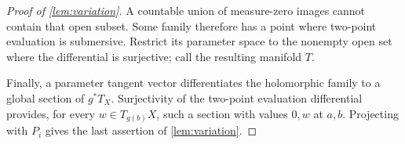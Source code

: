 \begin{proof}[Proof of \cref{lem:variation}]
A countable union of measure-zero images cannot contain
that open subset. Some family therefore has a point where
two-point evaluation is submersive. Restrict its parameter
space to the nonempty open set where the differential is
surjective; call the resulting manifold \(T\).

Finally, a parameter tangent vector differentiates the
holomorphic family to a global section of \(g^*T_X\).
Surjectivity of the two-point evaluation differential
provides, for every \(w\in T_{g(b)}X\), such a section with
values \(0,w\) at \(a,b\). Projecting with \(P_i\) gives the
last assertion of \cref{lem:variation}.
\end{proof}

